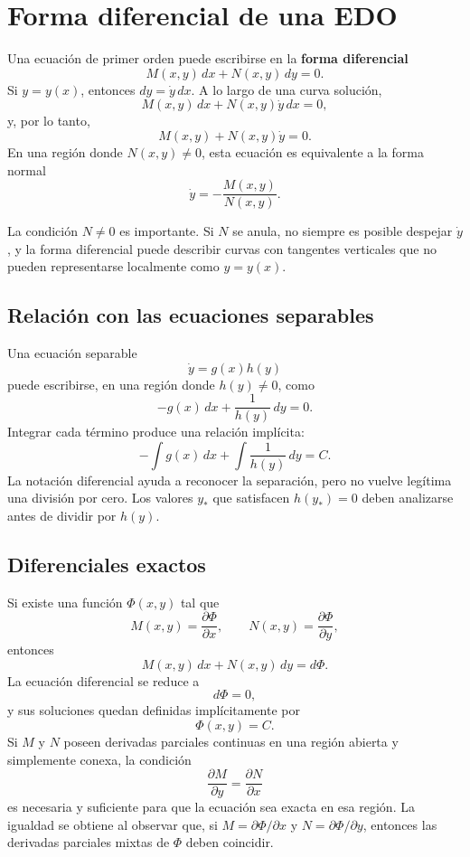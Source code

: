 \documentclass[12pt,a4paper]{article}
\begin{document}
	\clearpage
	\section{Forma diferencial de una EDO}

	Una ecuación de primer orden puede escribirse en la \textbf{forma diferencial}
	\[
	M(x,y)\,dx+N(x,y)\,dy=0.
	\]
Si \(y=y(x)\), entonces \(dy=\dot{y}\,dx\). A lo largo de una curva solución,
	\[
	M(x,y)\,dx+N(x,y)\dot{y}\,dx=0,
	\]
y, por lo tanto,
	\[
	M(x,y)+N(x,y)\dot{y}=0.
	\]
En una región donde \(N(x,y)\neq 0\), esta ecuación es equivalente a la forma normal
	\[
	\dot{y}=-\frac{M(x,y)}{N(x,y)}.
	\]

	La condición \(N\neq 0\) es importante. Si \(N\) se anula, no siempre es posible despejar \(\dot{y}\), y la forma diferencial puede describir curvas con tangentes verticales que no pueden representarse localmente como \(y=y(x)\).

	\subsection{Relación con las ecuaciones separables}

	Una ecuación separable
	\[
	\dot{y}=g(x)h(y)
	\]
puede escribirse, en una región donde \(h(y)\neq 0\), como
	\[
	-g(x)\,dx+\frac{1}{h(y)}\,dy=0.
	\]
Integrar cada término produce una relación implícita:
	\[
	-\int g(x)\,dx
	+
	\int\frac{1}{h(y)}\,dy
	=C.
	\]
La notación diferencial ayuda a reconocer la separación, pero no vuelve legítima una división por cero. Los valores \(y_\ast\) que satisfacen \(h(y_\ast)=0\) deben analizarse antes de dividir por \(h(y)\).

	\subsection{Diferenciales exactos}

	Si existe una función \(\Phi(x,y)\) tal que
	\[
	M(x,y)=\frac{\partial\Phi}{\partial x},
	\qquad
	N(x,y)=\frac{\partial\Phi}{\partial y},
	\]
entonces
	\[
	M(x,y)\,dx+N(x,y)\,dy=d\Phi.
	\]
La ecuación diferencial se reduce a
	\[
	d\Phi=0,
	\]
y sus soluciones quedan definidas implícitamente por
	\[
	\Phi(x,y)=C.
	\]
	Si $M$ y $N$ poseen derivadas parciales continuas en una región abierta y simplemente conexa, la condición
	\[
	\frac{\partial M}{\partial y}
	=
	\frac{\partial N}{\partial x}
	\]
es necesaria y suficiente para que la ecuación sea exacta en esa región. La igualdad se obtiene al observar que, si $M=\partial\Phi/\partial x$ y $N=\partial\Phi/\partial y$, entonces las derivadas parciales mixtas de $\Phi$ deben coincidir.
\end{document}
